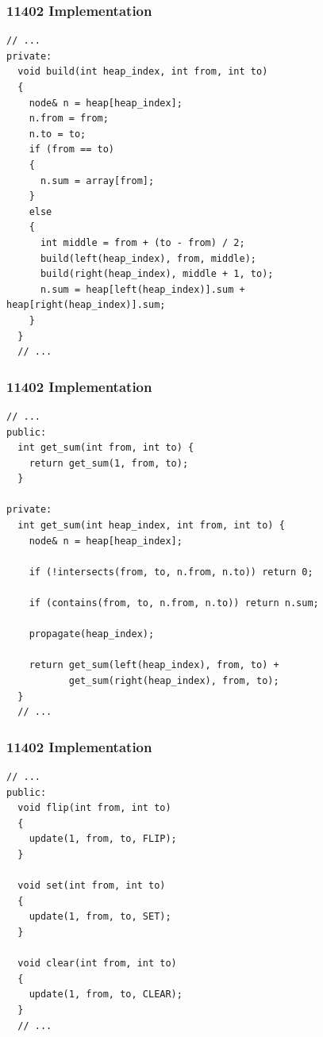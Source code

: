 \documentclass{beamer}
\begin{document}
\begin{frame}[containsverbatim]
\frametitle{11402 Implementation}

\scriptsize

\begin{lstlisting}[mathescape]
  // ...
private:
  void build(int heap_index, int from, int to)
  {
    node& n = heap[heap_index];
    n.from = from;
    n.to = to;
    if (from == to)
    {
      n.sum = array[from];
    }
    else
    {
      int middle = from + (to - from) / 2;
      build(left(heap_index), from, middle);
      build(right(heap_index), middle + 1, to);
      n.sum = heap[left(heap_index)].sum + heap[right(heap_index)].sum;
    }
  }
  // ...
\end{lstlisting}

\end{frame}

\begin{frame}[containsverbatim]
\frametitle{11402 Implementation}

\scriptsize

\begin{lstlisting}[mathescape]
  // ...
public:
  int get_sum(int from, int to) {
    return get_sum(1, from, to);
  }

private:
  int get_sum(int heap_index, int from, int to) {
    node& n = heap[heap_index];

    if (!intersects(from, to, n.from, n.to)) return 0;

    if (contains(from, to, n.from, n.to)) return n.sum;

    propagate(heap_index);

    return get_sum(left(heap_index), from, to) +
           get_sum(right(heap_index), from, to);
  }
  // ...
\end{lstlisting}

\end{frame}

\begin{frame}[containsverbatim]
\frametitle{11402 Implementation}

\scriptsize

\begin{lstlisting}[mathescape]
  // ...
public:
  void flip(int from, int to)
  {
    update(1, from, to, FLIP);
  }

  void set(int from, int to)
  {
    update(1, from, to, SET);
  }

  void clear(int from, int to)
  {
    update(1, from, to, CLEAR);
  }
  // ...
\end{lstlisting}

\end{frame}
\end{document}
